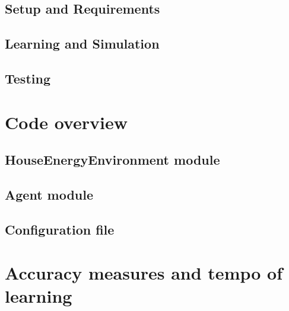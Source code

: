\documentclass{article}
\begin{document}
\subsection{Setup and Requirements}
\subsection{Learning and Simulation}
\subsection{Testing}
\section{Code overview}
\subsection{HouseEnergyEnvironment module}

\subsection{Agent module}

\subsection{Configuration file}

\section{Accuracy measures and tempo of learning}
\end{document}
